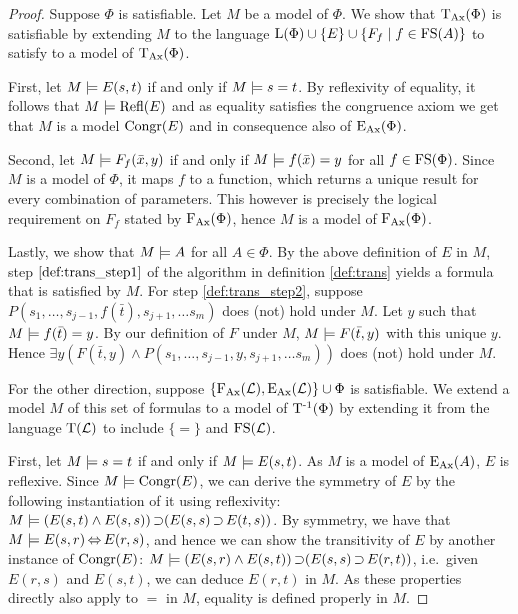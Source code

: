 \begin{proof}
	Suppose $\Phi$ is satisfiable.
	Let $M$ be a model of $\Phi$.
	We show that $\operatorname{\operatorname{T}_{Ax}}(\Phi)$ is satisfiable by extending $M$ to the language $\operatorname{L}(\Phi)\cup\{E\}\cup\{F_f\mid f \in \operatorname{FS}(A)\}$ to satisfy to a model of $\operatorname{\operatorname{T}_{Ax}}(\Phi)$.

	First, let $M \models E(s, t)$ if and only if $M \models s = t$.
	By reflexivity of equality, it follows that $M \models \operatorname{Refl}(E)$ and
	as equality satisfies the congruence axiom we get that $M$ is a model $\operatorname{Congr}(E)$ and in consequence also of $\operatorname{E_{Ax}}(\Phi)$.

	Second, let $M \models F_f(\bar x, y)$ if and only if $M \models f(\bar x) = y$ for all $f \in \operatorname{FS}(\Phi)$. 
	Since $M$ is a model of $\Phi$, it maps $f$ to a function, which returns a unique result for every combination of parameters.
	This however is precisely the logical requirement on $F_f$ stated by $\operatorname{F_{Ax}}(\Phi)$,   
	hence $M$ is a model of $\operatorname{F_{Ax}}(\Phi)$.

	Lastly, we show that $M \models A$ for all $A \in \Phi$.
	By the above definition of $E$ in $M$, step $\ref{def:trans_step1}$ of the algorithm in definition \ref{def:trans} yields a formula that is satisfied by $M$.
	For step \ref{def:trans_step2}, suppose $P(s_1, \ldots, s_{j-1}, f(\bar t),\allowbreak s_{j+1}, \ldots s_m)$ does (not) hold under $M$.
	Let $y$ such that $M \models f(\bar t)=y$.
	By our definition of $F$ under $M$, $M\models F(\bar t, y)$ with this unique $y$.
	Hence $\exists y (F(\bar t, y) \land P(s_1, \ldots, s_{j-1}, y, \allowbreak s_{j+1}, \ldots s_m))$ does (not) hold under $M$.


	For the other direction, suppose $\{\operatorname{F_{Ax}}(\operatorname{\mathcal{L}}), \operatorname{E_{Ax}}(\operatorname{\mathcal{L}})\} \cup \Phi$ is satisfiable.
	We extend a model $M$ of this set of formulas to a model of $\operatorname{T^{-1}}(\Phi)$ by extending it from the language $\operatorname{T}(\operatorname{\mathcal{L}})$ to include $\{=\}$ and $\operatorname{FS}(\operatorname{\mathcal{L}})$.

	First, let $M\models s = t$ if and only if $M\models E(s, t)$.
	As $M$ is a model of $\operatorname{E_{Ax}}(A)$, $E$ is reflexive. 
	Since $M \models \operatorname{Congr}(E)$, we can derive the symmetry of $E$ by the following instantiation of it using reflexivity:
	$M \entails (E(s, t) \land E(s, s)) \limpl ( E(s, s) \limpl\nolinebreak E(t, s))$.
	By symmetry, we have that $M \models E(s, r) \operatorname{\Leftrightarrow} E(r, s)$, and hence we can show the transitivity of $E$ by another instance of $\operatorname{Congr}(E)$: 
	$M \entails (E(s, r) \land E(s, t)) \limpl ( E(s, s) \limpl\nolinebreak E(r, t))$, i.e.\ given $E(r, s)$ and $E(s, t)$, we can deduce $E(r, t)$ in $M$.
	As these properties directly also apply to $=$ in $M$, equality is defined properly in $M$.


\end{proof}
